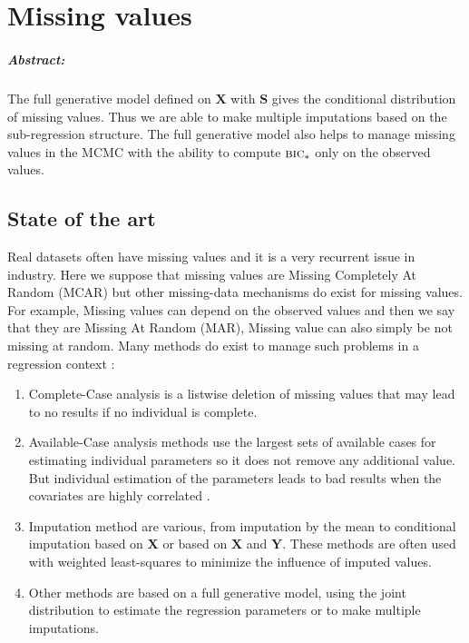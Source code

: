 \documentclass[12pt,a4paper]{report}
\begin{document}
\chapter{Missing values} \label{chapmiss}
	\paragraph{Abstract:} The full generative model defined on $\boldsymbol{X}$ with $\boldsymbol{S}$ gives the conditional distribution of missing values. Thus we are able to make multiple imputations based on the sub-regression structure. The full generative model also helps to manage missing values in the MCMC with the ability to compute $\mbox{{\sc bic}}_*$ only on the observed values. 
	
	 \section{State of the art}
	Real datasets often have missing values and it is a very recurrent issue in industry. 
			Here we suppose that missing values are Missing Completely At Random (MCAR) but other missing-data mechanisms do exist for missing values. For example, Missing values can depend on the observed values and then we say that they are Missing At Random (MAR), Missing value can also simply be not missing at random.
	 Many methods do exist to manage such problems in a regression context \cite{little1992regression}:
	 \begin{enumerate}
	\item Complete-Case analysis is a listwise deletion of missing values that may lead to no results if no individual is complete.  	
	\item Available-Case analysis methods use the largest sets of available cases for estimating individual parameters so it does not remove any additional value. But individual estimation of the parameters leads to bad results when the covariates are highly correlated \cite{haitovsky1968missing}.
	\item Imputation method are various, from imputation by the mean to conditional imputation based on $\boldsymbol{X}$ or based on $\boldsymbol{X}$ and $\boldsymbol{Y}$. These methods are often used with weighted least-squares to minimize the influence of imputed values.
	\item Other methods are based on a full generative model, using the joint distribution to estimate the regression parameters or to make multiple imputations.
	\end{enumerate} 
\end{document}

